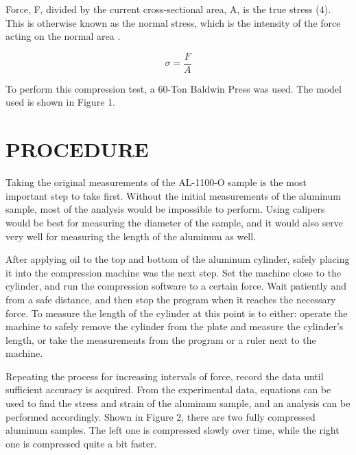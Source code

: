 \documentclass[12pt]{article}
\begin{document}
Force, F, divided by the current cross-sectional area, A, is the true stress (4). This is otherwise known as the normal stress, which is the intensity of the force acting on the normal area \cite{Hibbeler}.
\bigskip

\begin{equation}
\sigma = \frac {F}{A}
\end{equation}
\bigskip



To perform this compression test, a 60-Ton Baldwin Press was used. The model used is shown in Figure 1. 






\section*{\fontsize{12}{12}\selectfont PROCEDURE}
Taking the original measurements of the AL-1100-O sample is the most important step to take first. Without the initial measurements of the aluminum sample, most of the analysis would be impossible to perform. Using calipers would be best for measuring the diameter of the sample, and it would also serve very well for measuring the length of the aluminum as well. 
\bigskip

After applying oil to the top and bottom of the aluminum cylinder, safely placing it into the compression machine was the next step. Set the machine close to the cylinder, and run the compression software to a certain force. Wait patiently and from a safe distance, and then stop the program when it reaches the necessary force. To measure the length of the cylinder at this point is to either: operate the machine to safely remove the cylinder from the plate and measure the cylinder’s length, or take the measurements from the program or a ruler next to the machine.
\bigskip

Repeating the process for increasing intervals of force, record the data until sufficient accuracy is acquired. From the experimental data, equations can be used to find the stress and strain of the aluminum sample, and an analysis can be performed accordingly. Shown in Figure 2, there are two fully compressed aluminum samples. The left one is compressed slowly over time, while the right one is compressed quite a bit faster. 
\bigskip
\end{document}
